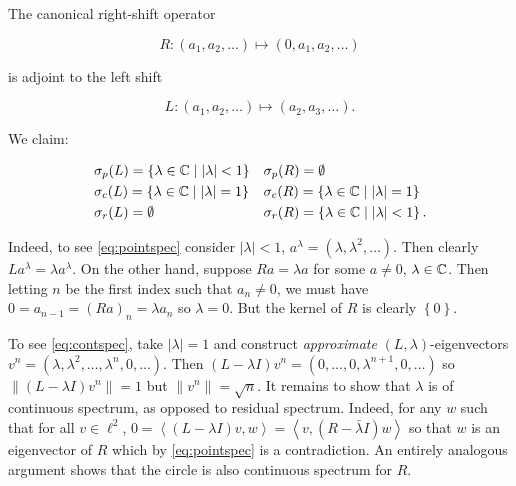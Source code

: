 \begin{example}
    \label{ex:shift}
    The canonical right-shift operator

    \begin{equation}
        R : (a_1, a_2, \ldots) \mapsto (0, a_1, a_2, \ldots)
    \end{equation}

    is adjoint to the left shift

    \begin{equation}
        L : (a_1, a_2, \ldots) \mapsto (a_2, a_3, \ldots) . 
    \end{equation}

    We claim: 

    \begin{align}
        \label{eq:pointspec}
        &\sigma_p (L) = \left\{ \lambda \in \mathbb{C} \mid | \lambda | < 1 \right\} &
        &\sigma_p (R) = \emptyset \\
        \label{eq:contspec}
        &\sigma_c (L) = \left\{ \lambda \in \mathbb{C} \mid | \lambda | = 1 \right\} &
        &\sigma_c (R) = \left\{ \lambda \in \mathbb{C} \mid | \lambda | = 1 \right\} \\
        \label{eq:resspec}
        &\sigma_r (L) = \emptyset & 
        &\sigma_r (R) = \left\{ \lambda \in \mathbb{C} \mid | \lambda | < 1 \right\} . 
    \end{align}

    Indeed, to see \ref{eq:pointspec} consider $| \lambda | < 1$, 
    $a^\lambda = (\lambda, \lambda^2, \ldots)$. Then clearly 
    $L a^\lambda = \lambda a^\lambda$. On the 
    other hand, suppose $R a = \lambda a$ for some $a \neq 0$, $\lambda \in \mathbb{C}$. Then 
    letting $n$ be the first index such that $a_n \neq 0$, we must have 
    $0 = a_{n-1} = (R a)_n = \lambda a_n$ so $\lambda = 0$. But the kernel of $R$ is 
    clearly $\left\{ 0 \right\}$. 

    To see \ref{eq:contspec}, take $| \lambda | = 1$ and construct \emph{approximate} 
    $(L, \lambda)$-eigenvectors 
    $v^n = \left( \lambda, \lambda^2, \ldots, \lambda^n, 0, \ldots \right)$. Then 
    $(L - \lambda I) v^n = (0, \ldots, 0, \lambda^{n+1}, 0, \ldots)$ so 
    $\| (L - \lambda I) v^n \| = 1$ but $\| v^n \| = \sqrt{n}$. It remains to show 
    that $\lambda$ is of continuous spectrum, as opposed to residual spectrum. Indeed, 
    for any $w$ such that for all $v \in \ell^2$, 
    $0 = \left\langle (L - \lambda I) v, w \right\rangle 
    = \left\langle v, (R - \bar{\lambda} I) w \right\rangle$ so that $w$ is an eigenvector of 
    $R$ which by \ref{eq:pointspec} is a contradiction. An entirely analogous argument 
    shows that the circle is also continuous spectrum for $R$. 


\end{example}
